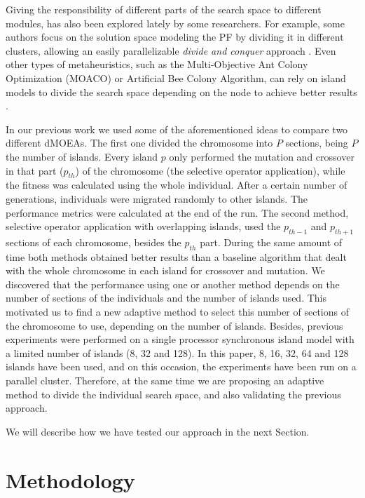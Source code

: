 \documentclass[preprint]{elsarticle}
\begin{document}
Giving the responsibility of different parts of the search space to
different modules, has also been explored lately by some
researchers. For example, some authors focus on the solution space
modeling the PF by dividing it in different clusters, allowing an
easily parallelizable {\em divide and conquer} approach
\citep{cheng2015adaptive}. 
Even other types of metaheuristics, 
such as the Multi-Objective Ant Colony Optimization (MOACO) 
or Artificial Bee Colony Algorithm, 
can rely on island models to divide the search space depending on 
the node to achieve better results \cite{Mora13paretobased,LUO2017235}. 

In our previous work \citep{Garcia16hpmoon} we used some of
the aforementioned ideas to compare two different dMOEAs. The first
one divided the chromosome into $P$ sections, being $P$ the number of
islands. Every island $p$ only performed the mutation and crossover in
that part ($p_{th}$) of the chromosome (the selective operator application), while the fitness was
calculated using the whole individual. After a certain number of
generations, individuals were migrated randomly to other islands. The
performance metrics were calculated at the end of the run. The second
method, selective operator application with overlapping islands, used the $p_{th-1}$ and
$p_{th+1}$ sections of each chromosome, besides the $p_{th}$
part. During the same amount of time both methods obtained better
results than a baseline algorithm that dealt with the whole chromosome
in each island for crossover and mutation. We discovered that the
performance using one or another method depends on the number of
sections of the individuals and the number of islands used. This
motivated us to find a new adaptive method to select this number of
sections of the chromosome to use, depending on the number of
islands. Besides, previous experiments were performed on a single
processor synchronous island model with a limited number of islands
(8, 32 and 128). In this paper,  8, 16, 32, 64 and 128 islands have
been used, and on this occasion, the experiments have been run on a parallel
cluster. Therefore, at the same time we are proposing an adaptive
method to divide the individual search space, and also validating the
previous approach. 


We will describe how we have tested our approach in the next Section.




%
%

\section{Methodology} %
\label{sec:methodology}
\end{document}
